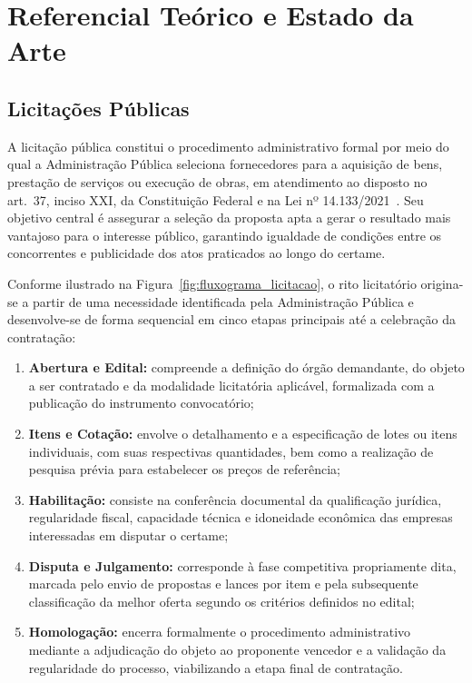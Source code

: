 \section{Referencial Teórico e Estado da Arte}
\label{sec:referencial}

\subsection{Licitações Públicas}

A licitação pública constitui o procedimento administrativo formal por meio do qual a Administração Pública seleciona fornecedores para a aquisição de bens, prestação de serviços ou execução de obras, em atendimento ao disposto no art.~37, inciso XXI, da Constituição Federal e na Lei nº 14.133/2021~\cite{brasil2021licitacoes}. Seu objetivo central é assegurar a seleção da proposta apta a gerar o resultado mais vantajoso para o interesse público, garantindo igualdade de condições entre os concorrentes e publicidade dos atos praticados ao longo do certame.

Conforme ilustrado na Figura~\ref{fig:fluxograma_licitacao}, o rito licitatório origina-se a partir de uma necessidade identificada pela Administração Pública e desenvolve-se de forma sequencial em cinco etapas principais até a celebração da contratação:

\begin{enumerate}
  \item \textbf{Abertura e Edital:} compreende a definição do órgão demandante, do objeto a ser contratado e da modalidade licitatória aplicável, formalizada com a publicação do instrumento convocatório;
  \item \textbf{Itens e Cotação:} envolve o detalhamento e a especificação de lotes ou itens individuais, com suas respectivas quantidades, bem como a realização de pesquisa prévia para estabelecer os preços de referência;
  \item \textbf{Habilitação:} consiste na conferência documental da qualificação jurídica, regularidade fiscal, capacidade técnica e idoneidade econômica das empresas interessadas em disputar o certame;
  \item \textbf{Disputa e Julgamento:} corresponde à fase competitiva propriamente dita, marcada pelo envio de propostas e lances por item e pela subsequente classificação da melhor oferta segundo os critérios definidos no edital;
  \item \textbf{Homologação:} encerra formalmente o procedimento administrativo mediante a adjudicação do objeto ao proponente vencedor e a validação da regularidade do processo, viabilizando a etapa final de contratação.
\end{enumerate}

